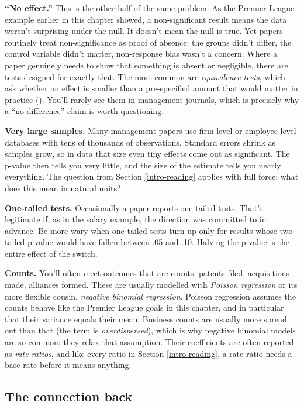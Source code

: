 \documentclass[
]{book}
\begin{document}
\textbf{``No effect.''} This is the other half of the same problem. As the Premier League example earlier in this chapter showed, a non-significant result means the data weren't surprising under the null. It doesn't mean the null is true. Yet papers routinely treat non-significance as proof of absence: the groups didn't differ, the control variable didn't matter, non-response bias wasn't a concern. Where a paper genuinely needs to show that something is absent or negligible, there are tests designed for exactly that. The most common are \emph{equivalence tests}, which ask whether an effect is smaller than a pre-specified amount that would matter in practice (). You'll rarely see them in management journals, which is precisely why a ``no difference'' claim is worth questioning.

\textbf{Very large samples.} Many management papers use firm-level or employee-level databases with tens of thousands of observations. Standard errors shrink as samples grow, so in data that size even tiny effects come out as significant. The p-value then tells you very little, and the size of the estimate tells you nearly everything. The question from Section \ref{intro-reading} applies with full force: what does this mean in natural units?

\textbf{One-tailed tests.} Occasionally a paper reports one-tailed tests. That's legitimate if, as in the salary example, the direction was committed to in advance. Be more wary when one-tailed tests turn up only for results whose two-tailed p-value would have fallen between .05 and .10. Halving the p-value is the entire effect of the switch.

\textbf{Counts.} You'll often meet outcomes that are counts: patents filed, acquisitions made, alliances formed. These are usually modelled with \emph{Poisson regression} or its more flexible cousin, \emph{negative binomial regression}. Poisson regression assumes the counts behave like the Premier League goals in this chapter, and in particular that their variance equals their mean. Business counts are usually more spread out than that (the term is \emph{overdispersed}), which is why negative binomial models are so common: they relax that assumption. Their coefficients are often reported as \emph{rate ratios}, and like every ratio in Section \ref{intro-reading}, a rate ratio needs a base rate before it means anything.

\subsection{The connection back}\label{the-connection-back-7}
\end{document}
